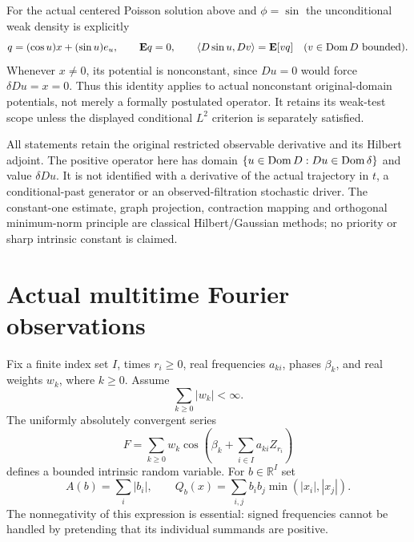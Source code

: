 \documentclass[11pt]{article}
\newcommand{\E}{\mathbf E}\newcommand{\R}{\mathbb R}
\begin{document}
For the actual centered Poisson solution above and $\phi=\sin$ the
unconditional weak density is explicitly
\[
 q=(\cos u)x+(\sin u)e_u,\qquad\E q=0,
 \qquad\langle D\sin u,Dv\rangle=\E[vq]
       \quad(v\in\Dom D\hbox{ bounded}).
\]
Whenever $x\ne0$, its potential is nonconstant, since $Du=0$ would force
$\delta Du=x=0$. Thus this identity applies to actual nonconstant
original-domain potentials, not merely a formally postulated operator.
It retains its weak-test scope unless the displayed conditional $L^2$
criterion is separately satisfied.

All statements retain the original restricted observable derivative and
its Hilbert adjoint. The positive operator here has domain
$\{u\in\operatorname{Dom} D:Du\in\operatorname{Dom}\delta\}$ and value $\delta Du$.
It is not identified with a derivative of the actual trajectory in $t$,
a conditional-past generator or an observed-filtration stochastic driver.
The constant-one estimate, graph projection, contraction mapping and
orthogonal minimum-norm principle are classical Hilbert/Gaussian methods;
no priority or sharp intrinsic constant is claimed.

\section{Actual multitime Fourier observations}
Fix a finite index set $I$, times $r_i\geq0$, real frequencies $a_{ki}$,
phases $\beta_k$, and real weights $w_k$, where $k\geq0$. Assume
\begin{equation}\label{eq:valuecost}
 \sum_{k\geq0}|w_k|<\infty.
\end{equation}
The uniformly absolutely convergent series
\begin{equation}\label{eq:F}
 F=\sum_{k\geq0}w_k\cos\left(\beta_k+\sum_{i\in I}a_{ki}Z_{r_i}\right)
\end{equation}
defines a bounded intrinsic random variable. For $b\in\R^I$ set
\[
 A(b)=\sum_i|b_i|,\qquad
 Q_b(x)=\sum_{i,j}b_i b_j\min(|x_i|,|x_j|).
\]
The nonnegativity of this expression is essential: signed frequencies
cannot be handled by pretending that its individual summands are positive.
\end{document}
